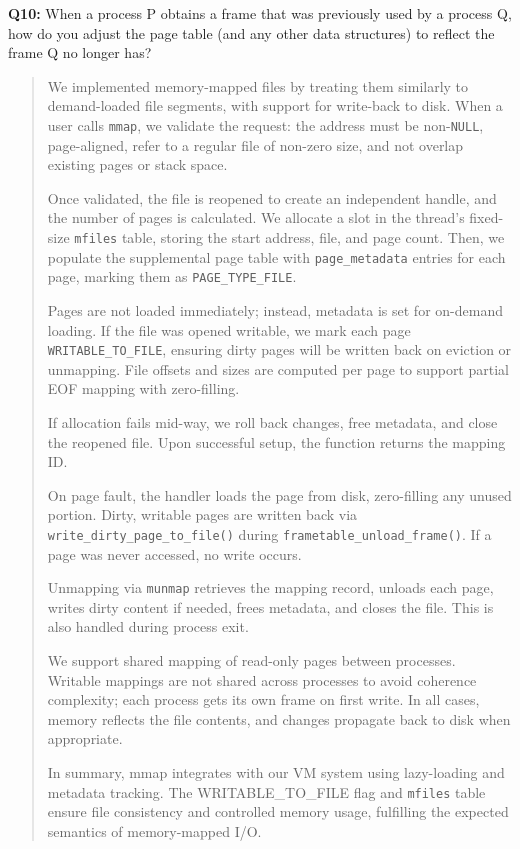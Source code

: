 \documentclass[a4paper,11pt]{paper}
\begin{document}
\textbf{Q10:} When a process P obtains a frame that was previously used by a process Q, how do you adjust the page table (and any other data structures) to reflect the frame Q no longer has?
\begin{quote}
 We implemented memory-mapped files by treating them similarly to demand-loaded file segments, with support for write-back to disk. When a user calls \texttt{mmap}, we validate the request: the address must be non-\texttt{NULL}, page-aligned, refer to a regular file of non-zero size, and not overlap existing pages or stack space.

Once validated, the file is reopened to create an independent handle, and the number of pages is calculated. We allocate a slot in the thread’s fixed-size \texttt{mfiles} table, storing the start address, file, and page count. Then, we populate the supplemental page table with \texttt{page\_metadata} entries for each page, marking them as \texttt{PAGE\_TYPE\_FILE}.

Pages are not loaded immediately; instead, metadata is set for on-demand loading. If the file was opened writable, we mark each page \texttt{WRITABLE\_TO\_FILE}, ensuring dirty pages will be written back on eviction or unmapping. File offsets and sizes are computed per page to support partial EOF mapping with zero-filling.

If allocation fails mid-way, we roll back changes, free metadata, and close the reopened file. Upon successful setup, the function returns the mapping ID.

On page fault, the handler loads the page from disk, zero-filling any unused portion. Dirty, writable pages are written back via \texttt{write\_dirty\_page\_to\_file()} during \texttt{frametable\_unload\_frame()}. If a page was never accessed, no write occurs.

Unmapping via \texttt{munmap} retrieves the mapping record, unloads each page, writes dirty content if needed, frees metadata, and closes the file. This is also handled during process exit.

We support shared mapping of read-only pages between processes. Writable mappings are not shared across processes to avoid coherence complexity; each process gets its own frame on first write. In all cases, memory reflects the file contents, and changes propagate back to disk when appropriate.

In summary, mmap integrates with our VM system using lazy-loading and metadata tracking. The WRITABLE\_TO\_FILE flag and \texttt{mfiles} table ensure file consistency and controlled memory usage, fulfilling the expected semantics of memory-mapped I/O.

\end{quote}
\end{document}
